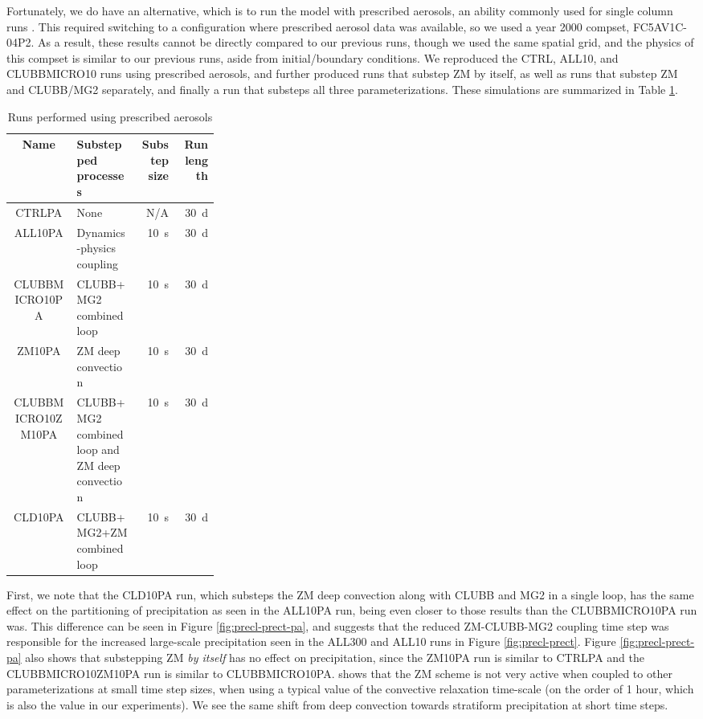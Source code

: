 \documentclass [11pt, proquest] {uwthesis}[2020/02/24]
\begin{document}
Fortunately, we do have an alternative, which is to run the model with prescribed aerosols, an ability commonly used for single column runs \parencite{LebassiHabtezion2015}. This required switching to a configuration where prescribed aerosol data was available, so we used a year \num{2000} compset, FC5AV1C-04P2. As a result, these results cannot be directly compared to our previous runs, though we used the same spatial grid, and the physics of this compset is similar to our previous runs, aside from initial/boundary conditions. We reproduced the CTRL, ALL10, and CLUBBMICRO10 runs using prescribed aerosols, and further produced runs that substep ZM by itself, as well as runs that substep ZM and CLUBB/MG2 separately, and finally a run that substeps all three parameterizations. These simulations are summarized in Table \ref{tab:pa-runs}.

\begin{table}
  \centering
  \begin{tabular}{|c|p{0.3\linewidth}|r|r|}
    \hline
    Name & Substepped processes & Substep size & Run length \\
    \hline
    CTRLPA & None & N/A & \SI{30}{\day} \\
    \hline
    ALL10PA & Dynamics-physics coupling & \SI{10}{\second} & \SI{30}{\day} \\
    \hline
    CLUBBMICRO10PA & CLUBB+MG2 combined loop & \SI{10}{\second} & \SI{30}{\day} \\
    \hline
    ZM10PA & ZM deep convection & \SI{10}{\second} & \SI{30}{\day} \\
    \hline
    CLUBBMICRO10ZM10PA & CLUBB+MG2 combined loop and ZM deep convection & \SI{10}{\second} & \SI{30}{\day} \\
    \hline
    CLD10PA & CLUBB+MG2+ZM combined loop & \SI{10}{\second} & \SI{30}{\day} \\
    \hline
  \end{tabular}
  \caption{Runs performed using prescribed aerosols}
  \label{tab:pa-runs}
\end{table}

First, we note that the CLD10PA run, which substeps the ZM deep convection along with CLUBB and MG2 in a single loop, has the same effect on the partitioning of precipitation as seen in the ALL10PA run, being even closer to those results than the CLUBBMICRO10PA run was. This difference can be seen in Figure \ref{fig:precl-prect-pa}, and suggests that the reduced ZM-CLUBB-MG2 coupling time step was responsible for the increased large-scale precipitation seen in the ALL300 and ALL10 runs in Figure \ref{fig:precl-prect}. Figure \ref{fig:precl-prect-pa} also shows that substepping ZM \emph{by itself} has no effect on precipitation, since the ZM10PA run is similar to CTRLPA and the CLUBBMICRO10ZM10PA run is similar to CLUBBMICRO10PA. \cite{Williamson2013} shows that the ZM scheme is not very active when coupled to other parameterizations at small time step sizes, when using a typical value of the convective relaxation time-scale (on the order of \num{1} hour, which is also the value in our experiments). We see the same shift from deep convection towards stratiform precipitation at short time steps.
\end{document}
